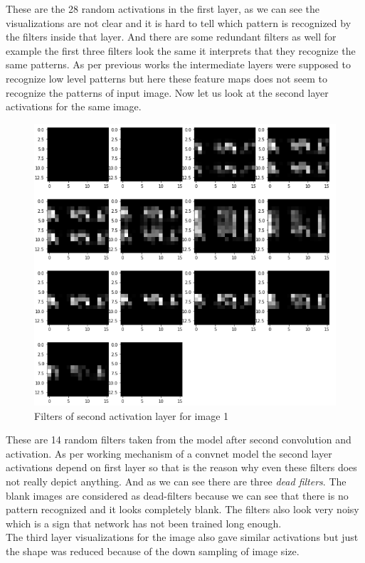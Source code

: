 \newpage \noindent  These are the 28 random activations in the first layer, as we can see the visualizations are not clear and it is hard to tell which pattern is recognized by the filters inside that layer. And there are some redundant filters as well for example the first three filters look the same it interprets that they recognize the same patterns. As per previous works the intermediate layers were supposed to recognize low level patterns but here these feature maps does not seem to recognize the patterns of input image. Now let us look at the second layer activations for the same image.


 \begin{figure}[h]
    \centering
    \includegraphics[width=1.0\textwidth]{thesis_template/images/layer2.png}
    \caption{\small Filters of second activation layer for image 1}
    \label{}
    \end{figure}

\newpage \noindent These are 14 random filters taken from the model after second convolution and activation. As per working mechanism of a convnet model the second layer activations depend on first layer so that is the reason why even these filters does not really depict anything. And as we can see there are three \textit{dead filters}. The blank images are considered as dead-filters because we can see that there is no pattern recognized and it looks completely blank. The filters also look very noisy which is a sign that network has not been trained long enough. \\
The third layer visualizations for the image also gave similar activations but just the shape was reduced because of the down sampling of image size. 




